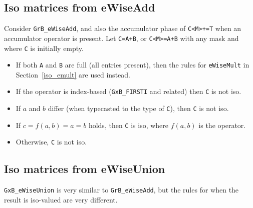 \subsection{Iso matrices from eWiseAdd}
\label{iso_add}

Consider \verb'GrB_eWiseAdd', and also the accumulator phase of \verb'C<M>+=T'
when an accumulator operator is present.  Let \verb'C=A+B', or \verb'C<M>=A+B'
with any mask and where \verb'C' is initially empty.

    \begin{itemize}
    \item If both \verb'A' and \verb'B' are full (all entries present), then
    the rules for \verb'eWiseMult' in Section~\ref{iso_emult} are used
    instead.

    \item If the operator is index-based (\verb'GxB_FIRSTI' and related) then
    \verb'C' is not iso.

    \item If $a$ and $b$ differ (when typecasted to the type of \verb'C'),
    then \verb'C' is not iso.

    \item If $c=f(a,b) = a = b$ holds, then \verb'C' is iso,
    where $f(a,b)$ is the operator.

    \item Otherwise, \verb'C' is not iso.
    \end{itemize}

\subsection{Iso matrices from eWiseUnion}
\label{iso_union}

\verb'GxB_eWiseUnion' is very similar to \verb'GrB_eWiseAdd', but the rules
for when the result is iso-valued are very different.

